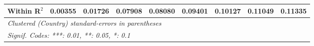 \begin{table}[htbp]
\begin{tabular}{lcccccccc}
      Within R$^2$                                                    & 0.00355  & 0.01726  & 0.07908        & 0.08080        & 0.09401        & 0.10127        & 0.11049         & 0.11335\\  
      \midrule \midrule
      \multicolumn{9}{l}{\emph{Clustered (Country) standard-errors in parentheses}}\\
      \multicolumn{9}{l}{\emph{Signif. Codes: ***: 0.01, **: 0.05, *: 0.1}}\\
   \end{tabular}
\end{table}


